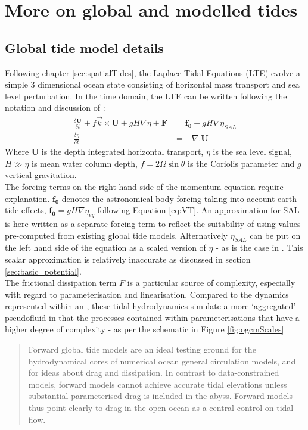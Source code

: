 \chapter{More on global and modelled tides}
\label{appendix:globalTides}
\section{Global tide model details}
Following chapter \ref{sec:spatialTides}, the Laplace Tidal Equations (LTE) evolve a simple 3 dimensional ocean state consisting of horizontal mass transport and sea level perturbation. In the time domain, the LTE can be written following the notation and discussion of \cite[pp185]{Egbert:2002ug}:
\begin{align}
    \label{eq:LTE_momtm}
    \frac{\delta \mathbf{U} }{ \delta t} + f\vec{k} \times \mathbf{U} + gH\nabla \eta  + \mathbf{F} &= \mathbf{f_0} + gH \nabla \eta_{SAL} \\
    \label{eq:LTE_cont}
    \frac{\delta \eta }{\delta t} &= -\nabla.\mathbf{U} 
\end{align}
Where $\mathbf{U}$ is the depth integrated horizontal transport, $\eta$ is the sea level signal, $H \gg \eta$ is mean water column depth, $f=2\Omega\sin\theta$ is the Coriolis parameter and $g$ vertical gravitation.\\
The forcing terms on the right hand side of the momentum equation \label{E:LTE_momtm} require explanation.  
$\mathbf{f_0}$ denotes the astronomical body forcing taking into account earth tide effects, $\mathbf{f_0} = gH\nabla\eta_{eq}$ following Equation \ref{eq:VT}.  
An approximation for SAL is here written as a separate forcing term to reflect the suitability of using values pre-computed from existing global tide models.   
Alternatively $\eta_{SAL}$ can be put on the left hand side of the equation as a scaled version of $\eta$ - as is the case in \MOM{}.   
This scalar approximation is relatively inaccurate as discussed in section \ref{sec:basic_potential}.\\
The frictional dissipation term $F$ is a particular source of complexity, especially with regard to parameterisation and linearisation.
Compared to the dynamics represented within an \OGCM{}, these tidal hydrodynamics simulate a more `aggregated' pseudofluid in that the processes contained within parameterisations that have a higher degree of complexity - as per the schematic in Figure \ref{fig:ogcmScales}
\begin{quotation}
Forward global tide models are an ideal testing ground for the hydrodynamical cores of numerical ocean general circulation models, and for ideas about drag and dissipation. In contrast to data-constrained models, forward models cannot achieve accurate tidal elevations unless substantial parameterised drag is included in the abyss. Forward models thus point clearly to drag in the open ocean as a central control on tidal flow.\citep{Arbic:2004wz}
\end{quotation} 
